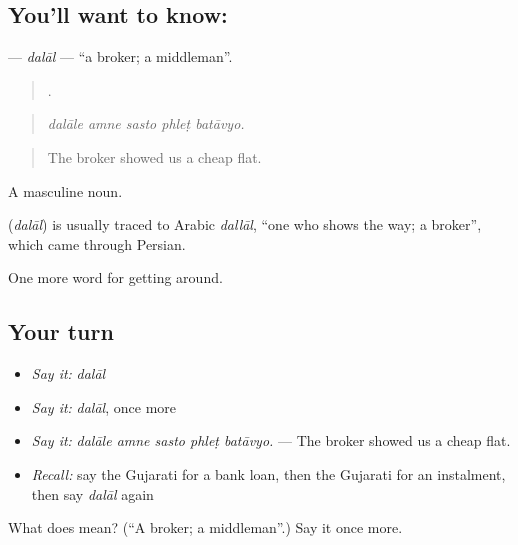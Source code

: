 \subsection*{You'll want to know: }
\textbf{} — \emph{dalāl} — \textquotedblleft{}a broker; a middleman\textquotedblright{}.

\begin{quote}
    .
\end{quote}

\begin{quote}
\emph{dalāle amne sasto phleṭ batāvyo.}
\end{quote}

\begin{quote}
The broker showed us a cheap flat.
\end{quote}

A masculine noun.

\begin{cousinweb}
\textbf{} (\emph{dalāl}) is usually traced to Arabic \emph{dallāl}, \textquotedblleft{}one who shows the way; a broker\textquotedblright{}, which came through Persian.
\end{cousinweb}

\begin{grammarlens}[title={What you've built}]
One more word for getting around.
\end{grammarlens}

\subsection*{Your turn}
\begin{itemize}
\raggedright
  \item \emph{Say it:} \emph{dalāl}
  \item \emph{Say it:} \emph{dalāl}, once more
  \item \emph{Say it:} \emph{dalāle amne sasto phleṭ batāvyo.} — The broker showed us a cheap flat.
  \item \emph{Recall:} say the Gujarati for a bank loan, then the Gujarati for an instalment, then say \emph{dalāl} again
\end{itemize}

\begin{tcolorbox}[breakable,colback=teal!4,colframe=teal!35!black,title={Before you move on}]
What does  mean? (\textquotedblleft{}A broker; a middleman\textquotedblright{}.) Say it once more.
\end{tcolorbox}
